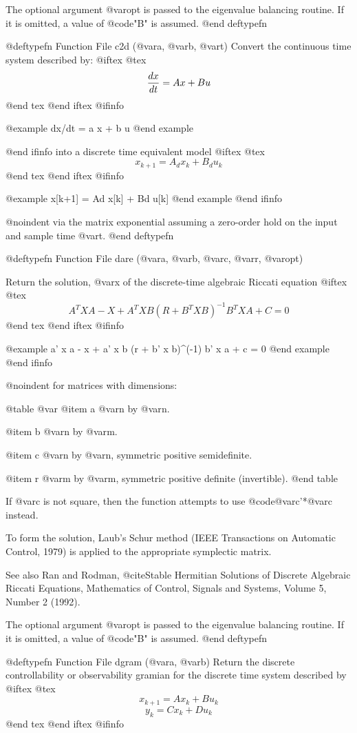 The optional argument @var{opt} is passed to the eigenvalue balancing
routine.  If it is omitted, a value of @code{"B"} is assumed.
@end deftypefn

@deftypefn {Function File} {} c2d (@var{a}, @var{b}, @var{t})
Convert the continuous time system described by:
@iftex
@tex
$$
 {dx\over dt} = A x + B u
$$
@end tex
@end iftex
@ifinfo

@example
dx/dt = a x + b u
@end example

@end ifinfo
into a discrete time equivalent model
@iftex
@tex
$$
 x_{k+1} = A_d x_k + B_d u_k
$$
@end tex
@end iftex
@ifinfo

@example
x[k+1] = Ad x[k] + Bd u[k]
@end example
@end ifinfo

@noindent
via the matrix exponential assuming a zero-order hold on the input and
sample time @var{t}.
@end deftypefn

@deftypefn {Function File} {} dare (@var{a}, @var{b}, @var{c}, @var{r}, @var{opt})

Return the solution, @var{x} of the discrete-time algebraic Riccati
equation
@iftex
@tex
$$
A^TXA - X + A^TXB (R + B^TXB)^{-1} B^TXA + C = 0
$$
@end tex
@end iftex
@ifinfo

@example
a' x a - x + a' x b (r + b' x b)^(-1) b' x a + c = 0
@end example
@end ifinfo

@noindent
for matrices with dimensions:

@table @var
@item a
@var{n} by @var{n}.

@item b
@var{n} by @var{m}.

@item c
@var{n} by @var{n}, symmetric positive semidefinite.

@item r
@var{m} by @var{m}, symmetric positive definite (invertible).
@end table

If @var{c} is not square, then the function attempts to use
@code{@var{c}'*@var{c}} instead.

To form the solution, Laub's Schur method (IEEE Transactions on
Automatic Control, 1979) is applied to the appropriate symplectic
matrix.

See also Ran and Rodman, @cite{Stable Hermitian Solutions of Discrete
Algebraic Riccati Equations}, Mathematics of Control, Signals and 
Systems, Volume 5, Number 2 (1992).

The optional argument @var{opt} is passed to the eigenvalue balancing
routine.  If it is omitted, a value of @code{"B"} is assumed.
@end deftypefn

@deftypefn {Function File} {} dgram (@var{a}, @var{b})
Return the discrete controllability or observability gramian for the
discrete time system described by
@iftex
@tex
$$
 x_{k+1} = A x_k + B u_k
$$
$$
 y_k = C x_k + D u_k
$$
@end tex
@end iftex
@ifinfo

